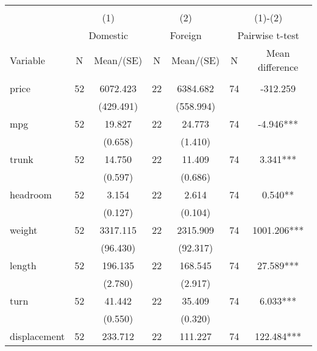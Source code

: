 
\begin{tabular}{@{\extracolsep{5pt}}lcccccc}
\\[-1.8ex]\hline \hline \\[-1.8ex]
 & \multicolumn{2}{c}{(1)}  & \multicolumn{2}{c}{(2)}  & \multicolumn{2}{c}{(1)-(2)} \\
 & \multicolumn{2}{c}{Domestic}  & \multicolumn{2}{c}{Foreign}  & \multicolumn{2}{c}{Pairwise t-test}  \\
Variable & N & Mean/(SE) & N & Mean/(SE) & N & Mean difference \\ \hline \\[-1.8ex] 
price   & 52    & 6072.423    & 22    & 6384.682    & 74    & -312.259   \\
 &   & (429.491)  &   & (558.994)  &   &  \\ [1ex]
mpg   & 52    & 19.827    & 22    & 24.773    & 74    & -4.946***   \\
 &   & (0.658)  &   & (1.410)  &   &  \\ [1ex]
trunk   & 52    & 14.750    & 22    & 11.409    & 74    & 3.341***   \\
 &   & (0.597)  &   & (0.686)  &   &  \\ [1ex]
headroom   & 52    & 3.154    & 22    & 2.614    & 74    & 0.540**   \\
 &   & (0.127)  &   & (0.104)  &   &  \\ [1ex]
weight   & 52    & 3317.115    & 22    & 2315.909    & 74    & 1001.206***   \\
 &   & (96.430)  &   & (92.317)  &   &  \\ [1ex]
length   & 52    & 196.135    & 22    & 168.545    & 74    & 27.589***   \\
 &   & (2.780)  &   & (2.917)  &   &  \\ [1ex]
turn   & 52    & 41.442    & 22    & 35.409    & 74    & 6.033***   \\
 &   & (0.550)  &   & (0.320)  &   &  \\ [1ex]
displacement   & 52    & 233.712    & 22    & 111.227    & 74    & 122.484***   \\

\end{tabular}
